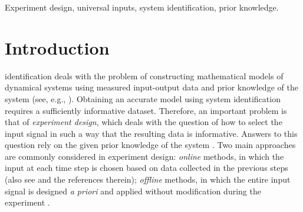 \documentclass[journal,twoside,web]{ieeecolor}
\begin{document}
\begin{IEEEkeywords}
Experiment design, universal inputs, system identification, prior knowledge.
\end{IEEEkeywords}

\section{Introduction}
\label{sec:introduction}

 identification deals with the problem of constructing mathematical models of dynamical systems using measured input-output data and prior knowledge of the system (see, e.g., \cite{goodwin1977dynamic,ljung1998system,van2012subspace,milanese2013bounding,pintelon2012system,DBLSCT2025}). Obtaining an accurate model using system identification requires a sufficiently informative dataset. Therefore, an important problem is that of \emph{experiment design}, which deals with the question of how to select the input signal in such a way that the resulting data is informative. Answers to this question rely on the given prior knowledge of the system \cite[Ch. 6]{goodwin1977dynamic}. Two main approaches are commonly considered in experiment design: \emph{online} methods, in which the input at each time step is chosen based on data collected in the previous steps \cite{borchers2011set,karimshoushtari2020design,van2021beyond,camlibel2025shortest} (also see \cite[Sec. 11.3]{hjalmarsson2005experiment} and the references therein); \emph{offline} methods, in which the entire input signal is designed \emph{a priori} and applied without modification during the experiment \cite{bai1985persistency,green1986persistence,willems2005note,coulson2022quantitative,berberich2023quantitative,rojas2007robust,gevers1986optimal,deistler1995consistency,weyer2002finite,campi2002finite,venkatasubramanian2025beyond,pronzato1989experiment,borchers2011design,dahleh1993sample,poolla1994time}.
\end{document}
